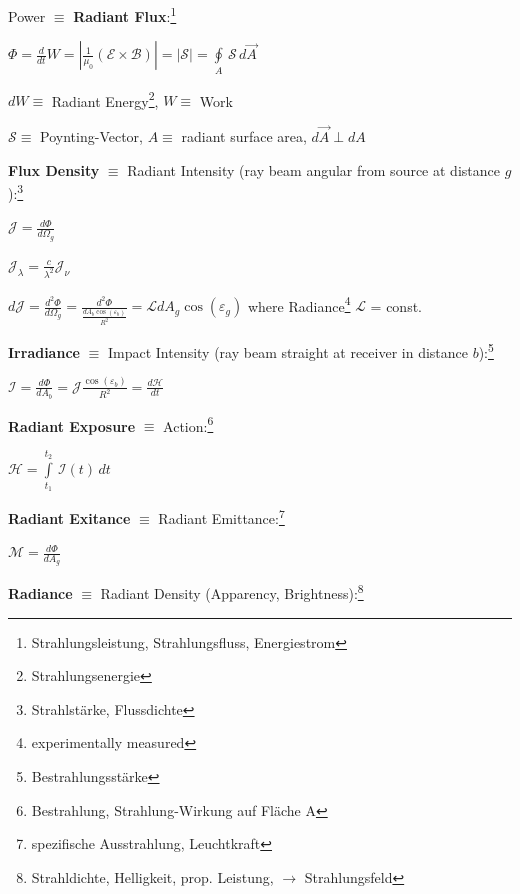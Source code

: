 Power $\equiv$ \textbf{Radiant Flux}:\footnote{Strahlungsleistung, Strahlungsfluss, Energiestrom}
	

$
\Phi = 
\frac{d}{dt}W = 
|\frac{1}{\mu_0}(\mathscr{E} \times \mathscr{B} ) | = 
| \mathscr{S} | = 
\oint\limits_A\, \mathscr{S}\, d\vec{A}
$

$dW \equiv$ Radiant Energy\footnote{Strahlungsenergie}, $W \equiv$ Work

$\mathscr{S} \equiv$ Poynting-Vector, $A \equiv$ radiant surface area, $d\vec{A} \perp dA$	


\vspace{5ex}
\textbf{Flux Density} $\equiv$ Radiant Intensity (ray beam angular from source at distance $g$):\footnote{Strahlstärke, Flussdichte}
 

$
\mathscr{J} = \frac{d\Phi}{d\Omega_g}
$

$
\mathscr{J}_{\lambda} = \frac{c}{\lambda^2} \mathscr{J}_{\nu}
$

$
d\mathscr{J} = \frac{d^2\Phi}{d\Omega_g} = 
\frac{d^2\Phi}{ \frac{dA_b \cos(\varepsilon_b)}{R^2} } = 
\mathscr{L} dA_g \cos(\varepsilon_g)
$
\newline where Radiance\footnote{experimentally measured} $\mathscr{L}$ = const.


\vspace{5ex}
\textbf{Irradiance} $\equiv$ Impact Intensity (ray beam straight at receiver in distance $b$):\footnote{Bestrahlungsstärke}

$
\mathscr{I} = \frac{d\Phi}{dA_b} = \mathscr{J} \frac{\cos(\varepsilon_b)}{R^2} = \frac{d\mathscr{H}}{dt}
$


\vspace{5ex}
\textbf{Radiant Exposure} $\equiv$ Action:\footnote{Bestrahlung, Strahlung-Wirkung auf Fläche A}

$
\mathscr{H} = \int\limits_{t_1}^{t_2}\, \mathscr{I}(t)\, dt
$


\vspace{5ex}
\textbf{Radiant Exitance} $\equiv$ Radiant Emittance:\footnote{spezifische Ausstrahlung, Leuchtkraft}
 

$
\mathscr{M} = \frac{d\Phi}{dA_g}
$


\vspace{5ex} 
\textbf{Radiance} $\equiv$ Radiant Density (Apparency, Brightness):\footnote{Strahldichte, Helligkeit, prop. Leistung, $\rightarrow$ Strahlungsfeld}
 

